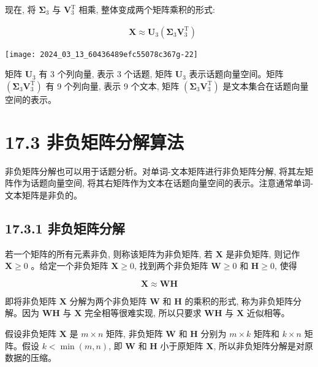 \documentclass[10pt]{article}
\begin{document}
现在, 将 $\boldsymbol{\Sigma}_{3}$ 与 $\boldsymbol{V}_{3}^{\mathrm{T}}$ 相乘, 整体变成两个矩阵乘积的形式:

$$
\begin{aligned}
& \boldsymbol{X} \approx \boldsymbol{U}_{3}\left(\boldsymbol{\Sigma}_{3} \boldsymbol{V}_{3}^{\mathrm{T}}\right)
\end{aligned}
$$

\begin{center}
\texttt{[image: 2024\_03\_13\_60436489efc55078c367g-22]}
\end{center}

矩阵 $\boldsymbol{U}_{3}$ 有 3 个列向量, 表示 3 个话题, 矩阵 $\boldsymbol{U}_{3}$ 表示话题向量空间。矩阵 $\left(\boldsymbol{\Sigma}_{3} \boldsymbol{V}_{3}^{\mathrm{T}}\right)$ 有 9 个列向量, 表示 9 个文本, 矩阵 $\left(\boldsymbol{\Sigma}_{3} \boldsymbol{V}_{3}^{\mathrm{T}}\right)$ 是文本集合在话题向量空间的表示。

\section*{17.3 非负矩阵分解算法}
非负矩阵分解也可以用于话题分析。对单词-文本矩阵进行非负矩阵分解, 将其左矩阵作为话题向量空间, 将其右矩阵作为文本在话题向量空间的表示。注意通常单词-文本矩阵是非负的。

\subsection*{17.3.1 非负矩阵分解}
若一个矩阵的所有元素非负, 则称该矩阵为非负矩阵, 若 $\boldsymbol{X}$ 是非负矩阵, 则记作 $\boldsymbol{X} \geqslant 0$ 。给定一个非负矩阵 $\boldsymbol{X} \geqslant 0$, 找到两个非负矩阵 $\boldsymbol{W} \geqslant 0$ 和 $\boldsymbol{H} \geqslant 0$, 使得


\begin{equation*}
\boldsymbol{X} \approx \boldsymbol{W} \boldsymbol{H} \tag{17.17}
\end{equation*}


即将非负矩阵 $\boldsymbol{X}$ 分解为两个非负矩阵 $\boldsymbol{W}$ 和 $\boldsymbol{H}$ 的乘积的形式, 称为非负矩阵分解。因为 $\boldsymbol{W} \boldsymbol{H}$ 与 $\boldsymbol{X}$ 完全相等很难实现, 所以只要求 $\boldsymbol{W} \boldsymbol{H}$ 与 $\boldsymbol{X}$ 近似相等。

假设非负矩阵 $\boldsymbol{X}$ 是 $m \times n$ 矩阵, 非负矩阵 $\boldsymbol{W}$ 和 $\boldsymbol{H}$ 分别为 $m \times k$ 矩阵和 $k \times n$ 矩阵。假设 $k<\min (m, n)$, 即 $\boldsymbol{W}$ 和 $\boldsymbol{H}$ 小于原矩阵 $\boldsymbol{X}$, 所以非负矩阵分解是对原数据的压缩。
\end{document}

